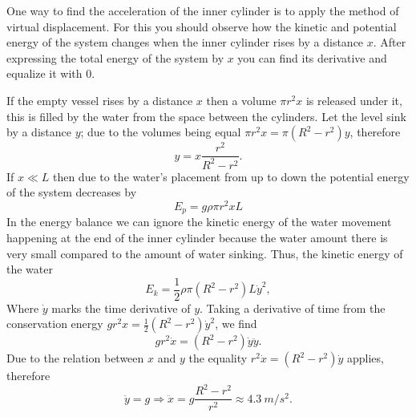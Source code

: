 \hinteng
One way to find the acceleration of the inner cylinder is to apply the method of virtual displacement. For this you should observe how the kinetic and potential energy of the system changes when the inner cylinder rises by a distance $x$. After expressing the total energy of the system by $x$ you can find its derivative and equalize it with 0.

\solueng
If the empty vessel rises by a distance $x$ then a volume $\pi r^2 x$ is released under it, this is filled by the water from the space between the cylinders. Let the level sink by a distance $y$; due to the volumes being equal $\pi r^2 x = \pi (R^2-r^2) y$, therefore
$$y=x\frac {r^2}{R^2-r^2}.$$
If $x\ll L$ then due to the water’s placement from up to down the potential energy of the system decreases by
$$E_p=g\rho \pi r^2 x L$$ 
In the energy balance we can ignore the kinetic energy of the water movement happening at the end of the inner cylinder because the water amount there is very small compared to the amount of water sinking. Thus, the kinetic energy of the water
$$E_k=\frac 12 \rho \pi (R^2-r^2) L\dot y^2,$$ 
Where $\dot y$ marks the time derivative of $y$. Taking a derivative of time from the conservation energy $gr^2x=\frac 12(R^2-r^2)\dot y^2$, we find
$$gr^2\dot x=(R^2-r^2)\dot y\ddot y.$$ 
Due to the relation between $x$ and $y$ the equality $r^2\dot x=(R^2-r^2)\dot
y$ applies, therefore
$$\ddot y = g\Rightarrow \ddot x = g\frac
{R^2-r^2}{r^2}\approx\SI{4,3}{m/s^2}.$$
\probend